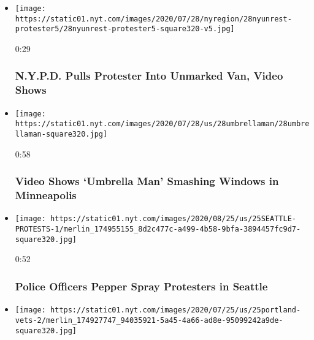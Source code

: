 \begin{itemize}
\item
  \href{https://www.nytimes.com/video/us/100000007262950/nypd-unmarked-van.html?action=click\&module=video-series-bar\&region=header\&pgtype=Article\&playlistId=video/minneapolis-george-floyd-death-video}{}

  \texttt{[image: https://static01.nyt.com/images/2020/07/28/nyregion/28nyunrest-protester5/28nyunrest-protester5-square320-v5.jpg]}

  0:29

  \hypertarget{nypd-pulls-protester-into-unmarked-van-video-shows}{%
  \subsubsection{N.Y.P.D. Pulls Protester Into Unmarked Van, Video
  Shows}\label{nypd-pulls-protester-into-unmarked-van-video-shows}}
\item
  \href{https://www.nytimes.com/video/us/100000007262407/umbrella-man-minneapolis-video.html?action=click\&module=video-series-bar\&region=header\&pgtype=Article\&playlistId=video/minneapolis-george-floyd-death-video}{}

  \texttt{[image: https://static01.nyt.com/images/2020/07/28/us/28umbrellaman/28umbrellaman-square320.jpg]}

  0:58

  \hypertarget{video-shows-umbrella-man-smashing-windows-in-minneapolis}{%
  \subsubsection{Video Shows `Umbrella Man' Smashing Windows in
  Minneapolis}\label{video-shows-umbrella-man-smashing-windows-in-minneapolis}}
\item
  \href{https://www.nytimes.com/video/us/politics/100000007257297/seattle-protest.html?action=click\&module=video-series-bar\&region=header\&pgtype=Article\&playlistId=video/minneapolis-george-floyd-death-video}{}

  \texttt{[image: https://static01.nyt.com/images/2020/08/25/us/25SEATTLE-PROTESTS-1/merlin\_174955155\_8d2c477c-a499-4b58-9bfa-3894457fc9d7-square320.jpg]}

  0:52

  \hypertarget{police-officers-pepper-spray-protesters-in-seattle}{%
  \subsubsection{Police Officers Pepper Spray Protesters in
  Seattle}\label{police-officers-pepper-spray-protesters-in-seattle}}
\item
  \texttt{[image: https://static01.nyt.com/images/2020/07/25/us/25portland-vets-2/merlin\_174927747\_94035921-5a45-4a66-ad8e-95099242a9de-square320.jpg]}


\end{itemize}
